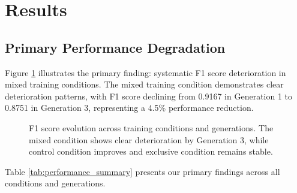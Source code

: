 \documentclass{article}
\begin{document}
\section{Results}

\subsection{Primary Performance Degradation}

Figure \ref{fig:f1_degradation} illustrates the primary finding: systematic F1 score deterioration in mixed training conditions. The mixed training condition demonstrates clear deterioration patterns, with F1 score declining from 0.9167 in Generation 1 to 0.8751 in Generation 3, representing a 4.5\% performance reduction.

\begin{figure}[H]
\centering
{}
\caption{F1 score evolution across training conditions and generations. The mixed condition shows clear deterioration by Generation 3, while control condition improves and exclusive condition remains stable.}
\label{fig:f1_degradation}
\end{figure}

Table \ref{tab:performance_summary} presents our primary findings across all conditions and generations.
\end{document}
